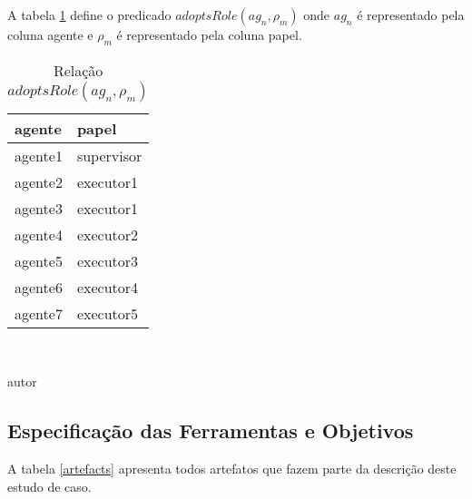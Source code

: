 A tabela \ref{agentsroles} define o predicado $adoptsRole(ag_n,\rho_m)$ onde $ag_n$ é representado pela coluna agente e $\rho_m$ é representado pela coluna papel.

\begin{table}[H]
\caption{Relação $adoptsRole(ag_n,\rho_m)$}
\centering
\begin{tabular}{|l|l|}
\hline
\textbf{agente} & \textbf{papel} \\ \hline
agente1 & supervisor \\ \hline
agente2 & executor1 \\ \hline
agente3 & executor1 \\ \hline
agente4 & executor2 \\ \hline
agente5 & executor3 \\ \hline
agente6 & executor4 \\ \hline
agente7 & executor5 \\ \hline
\end{tabular}
\label{agentsroles}
\\
\begin{center}
autor
\end{center}
\end{table}

\subsection{Especificação das Ferramentas e Objetivos}

A tabela \ref{artefacts} apresenta todos artefatos que fazem parte da descrição deste estudo de caso.


